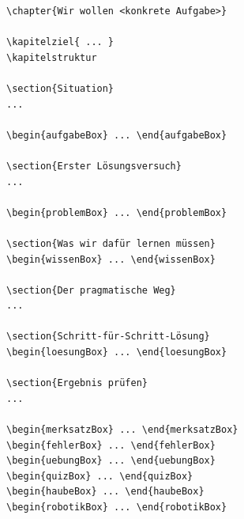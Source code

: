 \begin{lstlisting}[style=text]
\chapter{Wir wollen <konkrete Aufgabe>}

\kapitelziel{ ... }
\kapitelstruktur

\section{Situation}
...

\begin{aufgabeBox} ... \end{aufgabeBox}

\section{Erster Lösungsversuch}
...

\begin{problemBox} ... \end{problemBox}

\section{Was wir dafür lernen müssen}
\begin{wissenBox} ... \end{wissenBox}

\section{Der pragmatische Weg}
...

\section{Schritt-für-Schritt-Lösung}
\begin{loesungBox} ... \end{loesungBox}

\section{Ergebnis prüfen}
...

\begin{merksatzBox} ... \end{merksatzBox}
\begin{fehlerBox} ... \end{fehlerBox}
\begin{uebungBox} ... \end{uebungBox}
\begin{quizBox} ... \end{quizBox}
\begin{haubeBox} ... \end{haubeBox}
\begin{robotikBox} ... \end{robotikBox}
\end{lstlisting}
